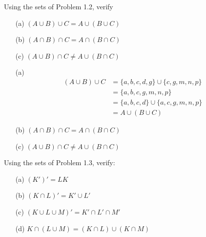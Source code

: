 \exercise
Using the sets of Problem 1.2, verify
\begin{itemize}
    \item[(a)]
        $(A \cup B) \cup C = A \cup (B \cup C)$
    \item[(b)]
        $(A \cap B) \cap C = A \cap (B \cap C)$
    \item[(c)]
        $(A \cup B) \cap C \neq A \cup (B \cap C)$
\end{itemize}

\answer
\begin{itemize}
    \item[(a)]
        \begin{align*}
            (A \cup B) \cup C &= \{a, b, c, d, g\} \cup \{c, g, m, n, p\} \\
                              &= \{a, b, c, g, m, n, p\} \\
                              &= \{a, b, c, d\} \cup \{a, c, g, m, n, p\} \\
                              &= A \cup (B \cup C)
        \end{align*}
    \item[(b)]
        $(A \cap B) \cap C = A \cap (B \cap C)$
    \item[(c)]
        $(A \cup B) \cap C \neq A \cup (B \cap C)$
\end{itemize}


\exercise
Using the sets of Problem 1.3, verify:
\begin{itemize}
    \item[(a)]
        $(K')' = LK$
    \item[(b)]
        $(K \cap L)' = K' \cup L'$
    \item[(c)]
        $(K \cup L \cup M)' = K' \cap L' \cap M'$
    \item[(d)]
        $K \cap (L \cup M) = (K \cap L) \cup (K \cap M)$
\end{itemize}

